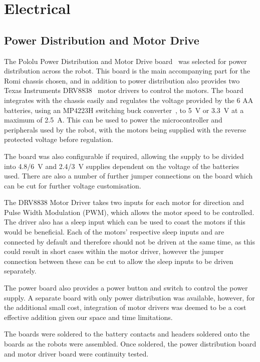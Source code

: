 
\chapter{Electrical}\label{electrical}

\section{Power Distribution and Motor Drive}\label{elec/poweranddrive}
The Pololu Power Distribution and Motor Drive board~\cite{pololupower}
was selected for power distribution across
the robot. This board is the main accompanying part for the Romi
chassis chosen, and in addition to power distribution also provides
two Texas Instruments DRV8838~\cite{texasdrivers} motor drivers to control the motors. The board integrates with the chassis easily
and regulates the voltage provided by the 6 AA batteries, using an
MP4223H switching buck converter~\cite{mpbuck}, to \SI{5}{\volt} or
\SI{3.3}{\volt} at a maximum of \SI{2.5}{\ampere}. This can be used
to power the microcontroller and peripherals used by the robot, with the motors being supplied with the reverse protected voltage before
regulation.

The board was also configurable if required, allowing the supply to be
divided into \SI{4.8/6}{\volt} and \SI{2.4/3}{\volt} supplies dependent on the voltage of the batteries used.
There are also a number of further jumper connections on the board which can
be cut for further voltage customisation.

The DRV8838 Motor Driver takes two inputs for each motor for direction and Pulse Width
Modulation (PWM), which allows the motor speed to be controlled. The
driver also has a sleep input which can be used to coast the motors if
this would be beneficial. Each of the motors' respective sleep inputs
and are connected by default and therefore should not be driven at the same time, as this could result in short cases within the motor driver, however
the jumper connection between these can be cut to allow the sleep inputs to
be driven separately.

The power board also provides a power button and switch to control the
power supply. A separate board with only power distribution was
available, however, for the additional small cost, integration of
motor drivers was deemed to be a cost effective addition given our space and time limitations.

The boards were soldered to the battery contacts and headers soldered
onto the boards as the robots were assembled. Once soldered, the power distribution board and 
motor driver board were continuity tested.

